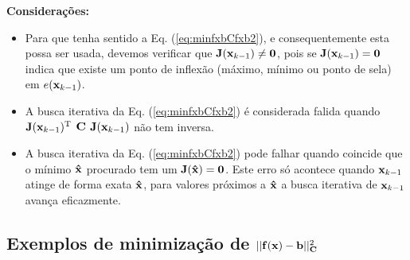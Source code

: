 \begin{theorem}
\textbf{Considerações:}

\begin{itemize}
\item Para que tenha sentido a Eq. (\ref{eq:minfxbCfxb2}),
 e consequentemente esta possa ser usada, devemos verificar que  $\MATRIX{J}(\VECTOR{x}_{k-1})\neq \MATRIX{0}$,
pois se $\MATRIX{J}(\VECTOR{x}_{k-1})= \MATRIX{0}$ indica que existe um ponto de inflexão 
(máximo, mínimo ou ponto de sela) em $e(\VECTOR{x}_{k-1})$.
\item A busca iterativa da Eq. (\ref{eq:minfxbCfxb2}) é considerada falida quando 
$\MATRIX{J}(\VECTOR{x}_{k-1})^{\transpose}$ $\MATRIX{C}$ $\MATRIX{J}(\VECTOR{x}_{k-1})$
não tem inversa.
\item A busca iterativa da Eq. (\ref{eq:minfxbCfxb2}) pode falhar quando coincide que o mínimo $\VECTOR{\hat{x}}$ procurado
tem um $\MATRIX{J}(\VECTOR{\hat{x}})=\MATRIX{0}$.
Este erro só acontece quando $\VECTOR{x}_{k-1}$ atinge de forma exata $\VECTOR{\hat{x}}$,
para valores próximos a $\VECTOR{\hat{x}}$ a busca iterativa de $\VECTOR{x}_{k-1}$ avança eficazmente.
\end{itemize}

\end{theorem}
\subsection{Exemplos de minimização de $||\VECTOR{f}(\VECTOR{x})-\VECTOR{b}||_{\MATRIX{C}}^2$}

